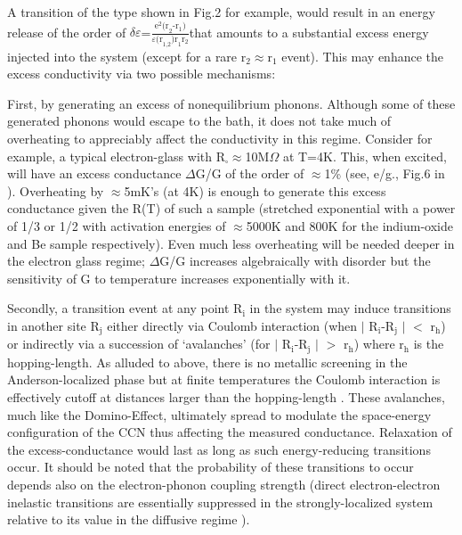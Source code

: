 \documentclass
[preprint,showpacs,byrevtex,10pt,twocolumn,tightenlines,prl,letterpaper]{revtex4}%
\begin{document}
A transition of the type shown in Fig.2 for example, would result in an energy
release of the order of $\delta\varepsilon$=$\frac{\text{e}^{\text{2}%
}\text{(r}_{\text{2}}\text{-r}_{\text{1}}\text{)}}{\varepsilon\text{(r}%
_{\text{1,2}}\text{)r}_{\text{1}}\text{r}_{\text{2}}}$that amounts to a
substantial excess energy injected into the system (except for a rare
r$_{\text{2}}\approx$r$_{\text{1}}$ event). This may enhance the excess
conductivity via two possible mechanisms:

First, by generating an excess of nonequilibrium phonons. Although some of
these generated phonons would escape to the bath, it does not take much of
overheating to appreciably affect the conductivity in this regime. Consider
for example, a typical electron-glass with R$_{\square}\approx$10M$\Omega$ at
T=4K. This, when excited, will have an excess conductance $\Delta$G/G of the
order of $\approx$1\% (see, e/g., Fig.6 in \cite{37}). Overheating by
$\approx$5mK's (at 4K) is enough to generate this excess conductance given the
R(T) of such a sample (stretched exponential with a power of 1/3 or 1/2 with
activation energies of $\approx$5000K and 800K for the indium-oxide and Be
sample \cite{37} respectively). Even much less overheating will be needed
deeper in the electron glass regime; $\Delta$G/G increases algebraically with
disorder but the sensitivity of G to temperature increases exponentially with it.

Secondly, a transition event at any point R$_{\text{i}}$ in the system may
induce transitions in another site R$_{\text{j}}$ either directly via Coulomb
interaction (when
$\vert$%
R$_{\text{i}}$-R$_{\text{j}}$%
$\vert$%
$<$%
r$_{\text{h}}$) or indirectly via a succession of `avalanches' (for
$\vert$%
R$_{\text{i}}$-R$_{\text{j}}$%
$\vert$%
$>$%
r$_{\text{h}}$) \cite{38,39} where r$_{\text{h}}$ is the hopping-length. As
alluded to above, there is no metallic screening in the Anderson-localized
phase but at finite temperatures the Coulomb interaction is effectively cutoff
at distances larger than the hopping-length \cite{38,39}. These avalanches,
much like the Domino-Effect, ultimately spread to modulate the space-energy
configuration of the CCN thus affecting the measured conductance. Relaxation
of the excess-conductance would last as long as such energy-reducing
transitions occur. It should be noted that the probability of these
transitions to occur depends also on the electron-phonon coupling strength
(direct electron-electron inelastic transitions are essentially suppressed in
the strongly-localized system relative to its value in the diffusive regime
\cite{38}).
\end{document}
